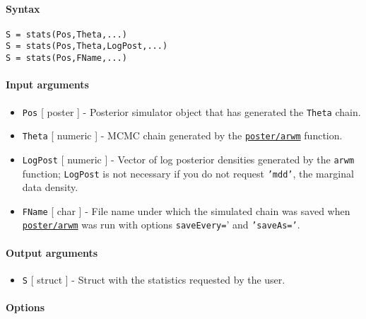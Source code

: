 


	\paragraph{Syntax}\label{syntax}

\begin{verbatim}
S = stats(Pos,Theta,...)
S = stats(Pos,Theta,LogPost,...)
S = stats(Pos,FName,...)
\end{verbatim}

\paragraph{Input arguments}\label{input-arguments}

\begin{itemize}
\item
  \texttt{Pos} {[} poster {]} - Posterior simulator object that has
  generated the \texttt{Theta} chain.
\item
  \texttt{Theta} {[} numeric {]} - MCMC chain generated by the
  \href{poster/arwm}{\texttt{poster/arwm}} function.
\item
  \texttt{LogPost} {[} numeric {]} - Vector of log posterior densities
  generated by the \texttt{arwm} function; \texttt{LogPost} is not
  necessary if you do not request \texttt{'mdd'}, the marginal data
  density.
\item
  \texttt{FName} {[} char {]} - File name under which the simulated
  chain was saved when \href{poster/arwm}{\texttt{poster/arwm}} was run
  with options \texttt{saveEvery=}' and \texttt{'saveAs='}.
\end{itemize}

\paragraph{Output arguments}\label{output-arguments}

\begin{itemize}
\itemsep1pt\parskip0pt
\item
  \texttt{S} {[} struct {]} - Struct with the statistics requested by
  the user.
\end{itemize}

\paragraph{Options}\label{options}


